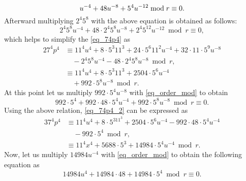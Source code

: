 \begin{equation}
    u^{-4}+48u^{-8}+5^4u^{-12} \bmod r  \equiv   0 \nonumber. \\
\end{equation}
Afterward multiplying $2^4 5^{8}$ with the above equation is obtained as follows:
\begin{equation}
    2^4 5^{8}u^{-4}+ 48 \cdot  2^4 5^{8}u^{-8}+  2^4 5^{12} u^{-12} \bmod r \equiv   0 \nonumber,
\end{equation}
which helps to simplify the \eqref{eq_74p4} as 
\begin{alignat}{2}
7^4p^4 &\equiv  11^4u^4 + 8\cdot 5^3 11^3 + 24 \cdot 5^6 11^2 u^{-4} +  32 \cdot 11 \cdot 5^9 u^{-8} \nonumber \\
& \quad   - 2^4  5^{8}u^{-4} - 48 \cdot 2^4 5^{8}u^{-8}\bmod r, \nonumber \\
& \equiv 11^4u^4+ 8 \cdot 5^3  11^3+2504 \cdot 5^6u^{-4}  \nonumber \\
& \quad + 992 \cdot 5^8 u^{-8} \bmod r. \label{eq_74p4_2}
\end{alignat}
At this point let us multiply $992 \cdot 5^4u^{-8}$  with \eqref{eq_order_mod} to obtain
\begin{equation}
     992 \cdot 5^4 +  992 \cdot 48 \cdot  5^4 u^{-4}+ 992 \cdot 5^8u^{-8} \bmod r  \equiv   0. \nonumber
\end{equation}
Using the above relation, \eqref{eq_74p4_2} can be expressed as  
\begin{alignat}{3}
 7^4p^4 & \equiv  11^4u^4+ 8 \cdot 5^311^3+2504 \cdot 5^6u^{-4} - 992 \cdot48 \cdot 5^4 u^{-4}  \nonumber \\
 & \quad -992 \cdot 5^4 \bmod r,  \nonumber \\
 & \equiv  11^4x^4+5688 \cdot 5^3 +14984 \cdot 5^4 u^{-4} \bmod r. \label{eq_74p4_3} 
\end{alignat}
Now, let us multiply $14984u^{-4}$ with \eqref{eq_order_mod} to obtain the following equation as
\begin{equation}
    14984u^4+14984 \cdot 48+ 14984 \cdot 5^4 \bmod r \equiv 0.
\end{equation}
